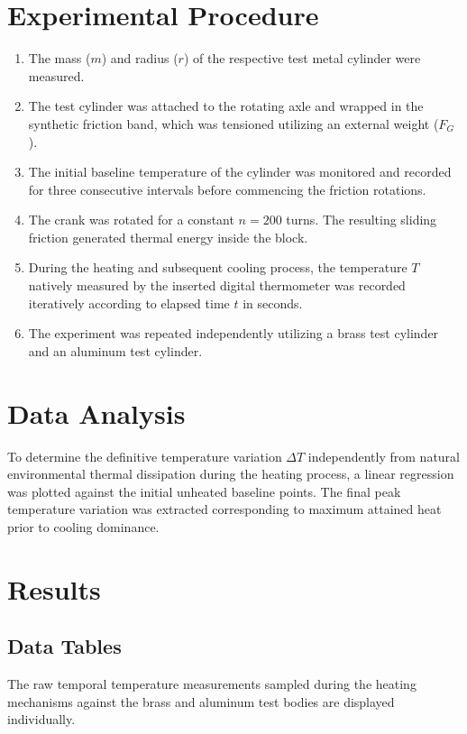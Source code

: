 \documentclass[journal]{IEEEtran}
\begin{document}
\section{Experimental Procedure}
\begin{enumerate}
    \item The mass ($m$) and radius ($r$) of the respective test metal cylinder were measured.
    \item The test cylinder was attached to the rotating axle and wrapped in the synthetic friction band, which was tensioned utilizing an external weight ($F_G$).
    \item The initial baseline temperature of the cylinder was monitored and recorded for three consecutive intervals before commencing the friction rotations.
    \item The crank was rotated for a constant $n = 200$ turns. The resulting sliding friction generated thermal energy inside the block.
    \item During the heating and subsequent cooling process, the temperature $T$ natively measured by the inserted digital thermometer was recorded iteratively according to elapsed time $t$ in seconds.
    \item The experiment was repeated independently utilizing a brass test cylinder and an aluminum test cylinder.
\end{enumerate}

\section{Data Analysis}
To determine the definitive temperature variation $\Delta T$ independently from natural environmental thermal dissipation during the heating process, a linear regression was plotted against the initial unheated baseline points. The final peak temperature variation was extracted corresponding to maximum attained heat prior to cooling dominance. 

\section{Results}

\subsection{Data Tables}
The raw temporal temperature measurements sampled during the heating mechanisms against the brass and aluminum test bodies are displayed individually.
\end{document}
